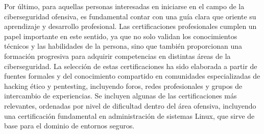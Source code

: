 \documentclass[a4paper, 11pt]{article}
\begin{document}
Por último, para aquellas personas interesadas en iniciarse en el campo de la ciberseguridad ofensiva, 
es fundamental contar con una guía clara que oriente su aprendizaje y desarrollo profesional. Las certificaciones 
profesionales cumplen un papel importante en este sentido, ya que no solo validan los conocimientos técnicos y las habilidades de la persona, sino que también proporcionan una formación progresiva para adquirir competencias en distintas áreas de la ciberseguridad. La selección de estas certificaciones ha sido elaborada a partir de fuentes formales y del conocimiento compartido en comunidades especializadas de hacking ético y pentesting, incluyendo foros, redes profesionales y grupos de intercambio de experiencias. Se incluyen algunas de las certificaciones más relevantes, ordenadas por nivel de dificultad dentro del área ofensiva, incluyendo una certificación fundamental en administración de sistemas Linux, que sirve de base para el dominio de entornos seguros.
\end{document}
